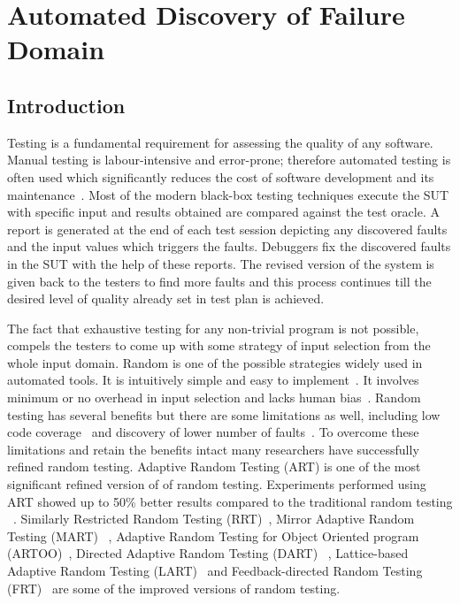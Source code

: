 \chapter{Automated Discovery of Failure Domain}
\label{chap:ADFD}

\section{Introduction}\label{sec:intro5}
Testing is a fundamental requirement for assessing the quality of any software. Manual testing is labour-intensive and error-prone; therefore automated testing is often used which significantly reduces the cost of software development and its maintenance~\cite{beizer1995black}. Most of the modern black-box testing techniques execute the SUT with specific input and results obtained are compared against the test oracle. A report is generated at the end of each test session depicting any discovered faults and the input values which triggers the faults. Debuggers fix the discovered faults in the SUT with the help of these reports. The revised version of the system is given back to the testers to find more faults and this process continues till the desired level of quality already set in test plan is achieved.

The fact that exhaustive testing for any non-trivial program is not possible, compels the testers to come up with some strategy of input selection from the whole input domain. Random is one of the possible strategies widely used in automated tools. It is intuitively simple and easy to implement~\cite{Ciupa2008, Forrester2000}. It involves minimum or no overhead in input selection and lacks human bias~\cite{hamlet1994, Linger1993}. Random testing has several benefits but there are some limitations as well, including low code coverage~\cite{Offutt1996} and discovery of lower number of faults~\cite{Chen1994}. To overcome these limitations and retain the benefits intact many researchers have successfully refined random testing. Adaptive Random Testing (ART) is one of the most significant refined version of of random testing. Experiments performed using ART showed up to 50\% better results compared to the traditional random testing ~\cite{Chen2008}.  Similarly Restricted Random Testing (RRT)~\cite{Chan2002}, Mirror Adaptive Random Testing (MART) ~\cite{Chen2004}, Adaptive Random Testing for Object Oriented program (ARTOO)~\cite{Ciupa2008}, Directed Adaptive Random Testing (DART) ~\cite{Godefroid2005}, Lattice-based Adaptive Random Testing (LART)~\cite{Mayer2005} and Feedback-directed Random Testing (FRT)~\cite{Pacheco2007} are some of the improved versions of random testing.

